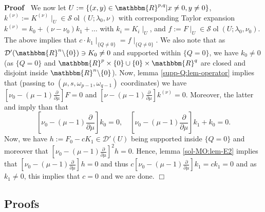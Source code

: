 \documentclass{article}
\newcommand{\assign}{:=}
\newcommand{\tmop}[1]{\ensuremath{\operatorname{#1}}}
\renewenvironment{proof}{\noindent\textbf{Proof\ }}{\hspace*{\fill}$\Box$\medskip}
\theoremstyle{remark}
\begin{document}
\begin{proof}
  We now let $U \assign \{ (x, y) \in \mathbbm{R}^{p, q} | x \neq 0, y \neq 0
  \}$, $k^{(\nu)} \assign K^{(\nu)} \mid_U \in \mathcal{S} \tmop{ol} (U ;
  \lambda_0, \nu)$ with corresponding Taylor expansion $k^{(\nu)} = k_0 + (\nu
  - \nu_0) k_1 + \ldots$ with $k_i = K_i \mid_U$, and $f \assign F
  \mid_U \in \mathcal{S} \tmop{ol} (U ; \lambda_0, \nu_0)$. The above
  implies that $c \cdot k_1 \mid_{\{ Q \neq 0 \}} = f \mid_{\{ Q \neq
  0 \}}$. We also note that as $\mathcal{D}' (\mathbbm{R}^n \backslash \{ 0
  \}) \ni K_0 \neq 0$ and supported within $\{ Q = 0 \}$, we have $k_0 \neq 0$
  (as $\{ Q = 0 \}$ and $\mathbbm{R}^p \times \{ 0 \} \cup \{ 0 \} \times
  \mathbbm{R}^q$ are closed and disjoint inside $\mathbbm{R}^n \backslash \{ 0
  \}$). Now, lemma \ref{supp-Q:lem-operator} implies that (passing to $(\mu,
  s, \omega_{p - 1}, \omega_{q - 1})$ coordinates) we have $\left[ \nu_0 -
  (\mu - 1) \frac{\partial}{\partial \mu} \right] F = 0$ and $\left[ \nu -
  (\mu - 1) \frac{\partial}{\partial \mu} \right] k^{(\nu)} = 0$. Moreover,
  the latter and {\cite[lem. 11.10]{kobayashi2015symmetry}} imply than that
  \[ \left[ \nu_0 - (\mu - 1) \frac{\partial}{\partial \mu} \right] k_0 = 0,
     \quad \left[ \nu_0 - (\mu - 1) \frac{\partial}{\partial \mu} \right] k_1
     + k_0 = 0. \]
  Now, we have $h \assign F_0 - c K_1 \in \mathcal{D}' (U)$ being supported
  inside $\{ Q = 0 \}$ and moreover that $\left[ \nu_0 - (\mu - 1)
  \frac{\partial}{\partial \mu} \right]^2 h = 0$. Hence, lemma
  \ref{sol-MO:lem-E2} implies that $\left[ \nu_0 - (\mu - 1)
  \frac{\partial}{\partial \mu} \right]^{} h = 0$ and thus $c \left[ \nu_0 -
  (\mu - 1) \frac{\partial}{\partial \mu} \right] k_1 = c k_1 = 0$ and as $k_1
  \neq 0$, this implies that $c = 0$ and we are done.
\end{proof}

\subsection{Proofs}
\end{document}
